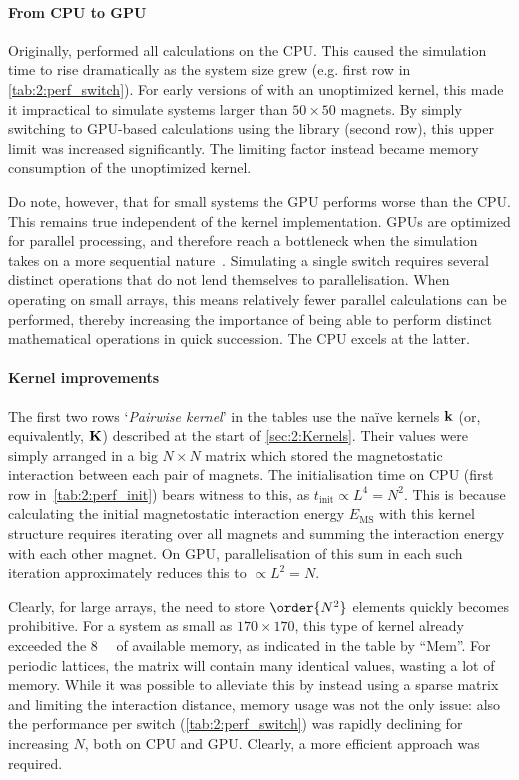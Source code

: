 \paragraph{From CPU to GPU}
Originally, \hotspice performed all calculations on the CPU. %
This caused the simulation time to rise dramatically as the system size grew (e.g. first row in \cref{tab:2:perf_switch}).
For early versions of \hotspice with an unoptimized kernel, this made it impractical to simulate systems larger than $50 \times 50$ magnets.
By simply switching to GPU-based calculations using the  library (second row), this upper limit was increased significantly.
The limiting factor instead became memory consumption of the unoptimized kernel. \par
Do note, however, that for small systems the GPU performs worse than the CPU.
This remains true independent of the kernel implementation.
GPUs are optimized for parallel processing, and therefore reach a bottleneck when the simulation takes on a more sequential nature~\cite{owens2008gpu}.
Simulating a single switch requires several distinct operations that do not lend themselves to parallelisation.
When operating on small arrays, this means relatively fewer parallel calculations can be performed, thereby increasing the importance of being able to perform distinct mathematical operations in quick succession.
The CPU excels at the latter.

\paragraph{Kernel improvements}
The first two rows `\textit{Pairwise kernel}' in the tables use the na\"ive kernels $\boldsymbol{\mathbf{k}}$ (or, equivalently, $\boldsymbol{\mathbf{K}}$) described at the start of \cref{sec:2:Kernels}.
Their values were simply arranged in a big $N \times N$ matrix which stored the magnetostatic interaction between each pair of magnets.
The initialisation time on CPU (first row in~\cref{tab:2:perf_init}) bears witness to this, as $t_\mathrm{init} \propto L^4 = N^2$.
This is because calculating the initial magnetostatic interaction energy $E_\mathrm{MS}$ with this kernel structure requires iterating over all magnets and summing the interaction energy with each other magnet.
On GPU, parallelisation of this sum in each such iteration approximately reduces this to $\propto L^2 = N$. \par
Clearly, for large arrays, the need to store $\order{N^2}$ elements quickly becomes prohibitive.
For a system as small as $170 \times 170$, this type of kernel already exceeded the \SI{8}{\giga\byte} of available memory, as indicated in the table by ``Mem''.
For periodic lattices, the matrix will contain many identical values, wasting a lot of memory.
While it was possible to alleviate this by instead using a sparse matrix and limiting the interaction distance, memory usage was not the only issue: also the performance per switch (\cref{tab:2:perf_switch}) was rapidly declining for increasing $N$, both on CPU and GPU. %
Clearly, a more efficient approach was required. \\\par


